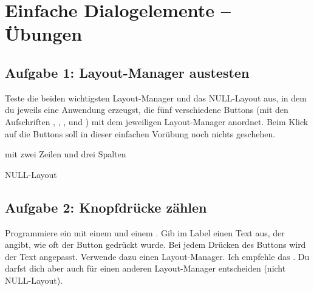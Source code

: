 \clearpage

\rehead[]{\textcolor{lightblue}{AvHG, Inf, My}}
\lohead[]{\textcolor{lightblue}{AvHG, Inf, My}}

\section{Einfache Dialogelemente -- Übungen}

\subsection{Aufgabe 1: Layout-Manager austesten}

Teste die beiden wichtigsten Layout-Manager und das NULL-Layout aus, in dem du
jeweils eine Anwendung erzeugst, die fünf verschiedene Buttons (mit den
Aufschriften , , ,
 und ) mit dem jeweiligen Layout-Manager
anordnet. Beim Klick auf die Buttons soll in dieser einfachen Vorübung noch
nichts geschehen.

\begin{compactenum}[a)]
\item {}
\item {} mit zwei Zeilen und drei Spalten
\item NULL-Layout
\end{compactenum}


\subsection{Aufgabe 2: Knopfdrücke zählen}

Programmiere ein  mit einem  und einem
. Gib im Label einen Text aus, der angibt, wie oft der Button
gedrückt wurde. Bei jedem Drücken des Buttons wird der Text angepasst. Verwende
dazu einen Layout-Manager. Ich empfehle das . Du darfst dich
aber auch für einen anderen Layout-Manager entscheiden (nicht NULL-Layout).

